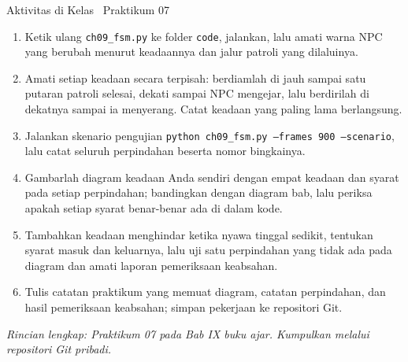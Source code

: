 \documentclass[aspectratio=169,10pt]{beamer}
\begin{document}
\begin{frame}{Aktivitas di Kelas \textperiodcentered\ Praktikum 07}
\begin{enumerate}
  \item Ketik ulang \texttt{ch09\_fsm.py} ke folder \texttt{code}, jalankan,
        lalu amati warna NPC yang berubah menurut keadaannya dan jalur patroli
        yang dilaluinya.
  \item Amati setiap keadaan secara terpisah: berdiamlah di jauh sampai satu
        putaran patroli selesai, dekati sampai NPC mengejar, lalu berdirilah di
        dekatnya sampai ia menyerang. Catat keadaan yang paling lama
        berlangsung.
  \item Jalankan skenario pengujian
        \texttt{python ch09\_fsm.py --frames 900 --scenario}, lalu catat
        seluruh perpindahan beserta nomor bingkainya.
  \item Gambarlah diagram keadaan Anda sendiri dengan empat keadaan dan syarat
        pada setiap perpindahan; bandingkan dengan diagram bab, lalu periksa
        apakah setiap syarat benar-benar ada di dalam kode.
  \item Tambahkan keadaan menghindar ketika nyawa tinggal sedikit, tentukan
        syarat masuk dan keluarnya, lalu uji satu perpindahan yang tidak ada
        pada diagram dan amati laporan pemeriksaan keabsahan.
  \item Tulis catatan praktikum yang memuat diagram, catatan perpindahan, dan
        hasil pemeriksaan keabsahan; simpan pekerjaan ke repositori Git.
\end{enumerate}
\vspace{0.10cm}
{\footnotesize\color{ubAccent}\itshape Rincian lengkap: Praktikum 07 pada Bab IX
buku ajar. Kumpulkan melalui repositori Git pribadi.}
\end{frame}
\end{document}
